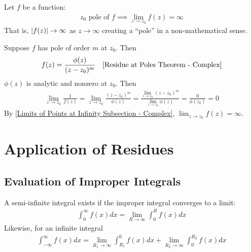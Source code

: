\documentclass[12pt, english]{book}
\makeatletter
\renewenvironment{proof}[1][\proofname]{\par
	\pushQED{\qed}%
	\normalfont \topsep6\p@\@plus6\p@\relax
	\list{}{%
		\settowidth{\leftmargin}{\itshape\proofname:\hskip\labelsep}%
		\setlength{\labelwidth}{0pt}%
		\setlength{\itemindent}{-\leftmargin}%
		}%
	\item[\hskip\labelsep\itshape#1\@addpunct{:}]\ignorespaces
	}{\popQED\endlist\@endpefalse}
\makeatother
\begin{document}
	\begin{theorem}
		Let \(f\) be a function:
		\begin{align*}
			z_0 \text{ pole of } f \implies \lim_{z\rightarrow z_0} f(z) = \infty
		\end{align*}
		That is, \(\abs{f(z)} \rightarrow \infty\) as \(z \rightarrow \infty\) creating a ``pole'' in a non-mathematical sense. 
	\end{theorem}
	\begin{proof}
		Suppose \(f\) has pole of order \(m\) at \(z_0\). Then 
		\begin{align*}
			f(z) &= \frac{\phi(z)}{(z-z_0)^m}	&	\text{\Cref{Residue at Poles Theorem - Complex}}
		\end{align*}
		\(\phi(z)\) is analytic and nonzero at \(z_0\). Then
		\begin{align*}
			\lim_{z\rightarrow z_0} \frac{1}{f(z)} 
			= \lim_{z\rightarrow z_0} \frac{(z-z_0)^m}{\phi(z)}
			= \frac{\lim_{z\rightarrow z_0} (z-z_0)^m}{\lim_{z\rightarrow z_0} \phi(z)}
			= \frac{0}{\phi(z_0)} = 0
		\end{align*}
		By \cref{Limits of Points at Infinity Subsection - Complex}, \(\lim_{z\rightarrow z_0} f(z) = \infty\).
	\end{proof}

	\section{Application of Residues} \label{Application of Residues Section - Complex}
	
	\subsection{Evaluation of Improper Integrals} \label{Evaluation of Improper Integrals Subsection - Complex}
	
	\begin{definition}
		\label{Converge (Infinite Integral) Definition - Compleex}
		A semi-infinite integral exists if the improper integral converges to a limit:
		\begin{align*}
			\int_{0}^{\infty} f(x) dx = \lim_{R\rightarrow \infty} \int_{0}^{R} f(x) dx
		\end{align*}
		Likewise, for an infinite integral
		\begin{align*}
			\int_{-\infty}^{\infty} f(x) dx = \lim_{R_1 \rightarrow \infty} \int_{R_1}^{0} f(x) dx + \lim_{R_2 \rightarrow \infty} \int_{0}^{R_2} f(x) dx
		\end{align*}
	\end{definition}
\end{document}
